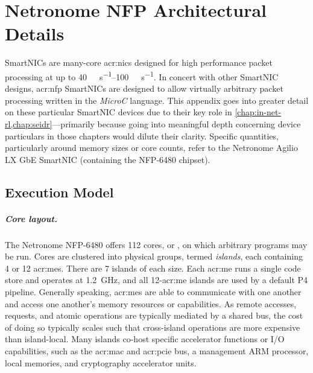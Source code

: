 \chapter{Netronome NFP Architectural Details}
\label{adx:nfp-arch}

 SmartNICs are many-core  \glspl{acr:nic} designed for high performance packet processing at up to \qtyrange{40}{100}{\giga\bit\per\second}.
In concert with other SmartNIC designs, \gls{acr:nfp} SmartNICs are designed to allow virtually arbitrary packet processing written in the \emph{MicroC} language.
This appendix goes into greater detail on these particular SmartNIC devices due to their key role in \cref{chap:in-net-rl,chap:seidr}---primarily because going into meaningful depth concerning device particulars in those chapters would dilute their clarity.
Specific quantities, particularly around memory sizes or core counts, refer to the Netronome Agilio LX GbE SmartNIC (containing the NFP-6480 chipset).

\section{Execution Model}
\paragraph{Core layout.}
The Netronome NFP-6480 offers \num{112} cores, or , on which arbitrary programs may be run.
Cores are clustered into physical groups, termed \emph{islands}, each containing 4 or 12 \glspl{acr:me}.
There are 7 islands of each size.
Each \gls{acr:me} runs a single code store and operates at \qty{1.2}{\giga\hertz}, and all 12-\gls{acr:me} islands are used by a default P4 pipeline.
Generally speaking, \glspl{acr:me} are able to communicate with one another and access one another's memory resources or capabilities.
As remote accesses, requests, and atomic operations are typically mediated by a shared  bus, the cost of doing so typically scales such that cross-island operations are more expensive than island-local.
Many islands co-host specific accelerator functions or I/O capabilities, such as the \gls{acr:mac} and \gls{acr:pcie} bus, a management ARM processor, local memories, and cryptography accelerator units.

